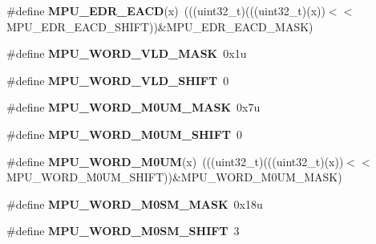\begin{DoxyCompactItemize}
\item 
\#define {\bfseries M\+P\+U\+\_\+\+E\+D\+R\+\_\+\+E\+A\+CD}(x)~(((uint32\+\_\+t)(((uint32\+\_\+t)(x))$<$$<$M\+P\+U\+\_\+\+E\+D\+R\+\_\+\+E\+A\+C\+D\+\_\+\+S\+H\+I\+FT))\&M\+P\+U\+\_\+\+E\+D\+R\+\_\+\+E\+A\+C\+D\+\_\+\+M\+A\+SK)\hypertarget{group__MPU__Register__Masks_gac85ecc9802951a4346e15eb35e3f4f49}{}\label{group__MPU__Register__Masks_gac85ecc9802951a4346e15eb35e3f4f49}

\item 
\#define {\bfseries M\+P\+U\+\_\+\+W\+O\+R\+D\+\_\+\+V\+L\+D\+\_\+\+M\+A\+SK}~0x1u\hypertarget{group__MPU__Register__Masks_ga44e24e528550aa8ae4520965651fc1d9}{}\label{group__MPU__Register__Masks_ga44e24e528550aa8ae4520965651fc1d9}

\item 
\#define {\bfseries M\+P\+U\+\_\+\+W\+O\+R\+D\+\_\+\+V\+L\+D\+\_\+\+S\+H\+I\+FT}~0\hypertarget{group__MPU__Register__Masks_ga9b01ac6c738050f879b0d513ac37afbd}{}\label{group__MPU__Register__Masks_ga9b01ac6c738050f879b0d513ac37afbd}

\item 
\#define {\bfseries M\+P\+U\+\_\+\+W\+O\+R\+D\+\_\+\+M0\+U\+M\+\_\+\+M\+A\+SK}~0x7u\hypertarget{group__MPU__Register__Masks_ga81c4b50e1693f2f64236771f4588ce0e}{}\label{group__MPU__Register__Masks_ga81c4b50e1693f2f64236771f4588ce0e}

\item 
\#define {\bfseries M\+P\+U\+\_\+\+W\+O\+R\+D\+\_\+\+M0\+U\+M\+\_\+\+S\+H\+I\+FT}~0\hypertarget{group__MPU__Register__Masks_ga636500a039c88639b9b03b0624e934ce}{}\label{group__MPU__Register__Masks_ga636500a039c88639b9b03b0624e934ce}

\item 
\#define {\bfseries M\+P\+U\+\_\+\+W\+O\+R\+D\+\_\+\+M0\+UM}(x)~(((uint32\+\_\+t)(((uint32\+\_\+t)(x))$<$$<$M\+P\+U\+\_\+\+W\+O\+R\+D\+\_\+\+M0\+U\+M\+\_\+\+S\+H\+I\+FT))\&M\+P\+U\+\_\+\+W\+O\+R\+D\+\_\+\+M0\+U\+M\+\_\+\+M\+A\+SK)\hypertarget{group__MPU__Register__Masks_ga470dfe214bd7a49bc45b0a3bed28dd80}{}\label{group__MPU__Register__Masks_ga470dfe214bd7a49bc45b0a3bed28dd80}

\item 
\#define {\bfseries M\+P\+U\+\_\+\+W\+O\+R\+D\+\_\+\+M0\+S\+M\+\_\+\+M\+A\+SK}~0x18u\hypertarget{group__MPU__Register__Masks_gafda0a1d29fd430d9445e755ca6966426}{}\label{group__MPU__Register__Masks_gafda0a1d29fd430d9445e755ca6966426}

\item 
\#define {\bfseries M\+P\+U\+\_\+\+W\+O\+R\+D\+\_\+\+M0\+S\+M\+\_\+\+S\+H\+I\+FT}~3\hypertarget{group__MPU__Register__Masks_ga71cd35cba4582e00c7461d7c65b8756b}{}\label{group__MPU__Register__Masks_ga71cd35cba4582e00c7461d7c65b8756b}


\end{DoxyCompactItemize}
